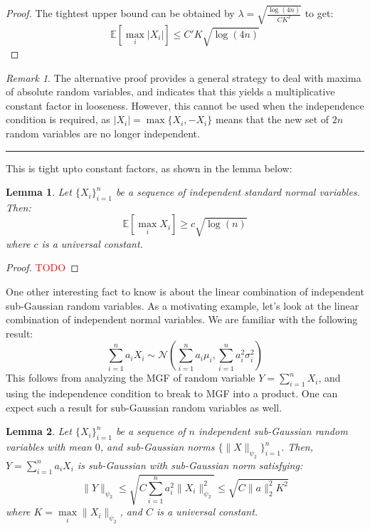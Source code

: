 \documentclass{article}
\newtheorem{lemma}{Lemma}[subsection]
\theoremstyle{remark}
\newtheorem*{remark}{Remark}
\newcommand{\comprule}{\textcolor[RGB]{220,220,220}{\rule{\linewidth}{0.2pt}}}
\newcommand{\Exp}{\mathbb{E}}
\newcommand{\calN}{\mathcal{N}}
\newcommand{\TODO}{\textcolor{red}{TODO}}
\begin{document}
\begin{proof}
The tightest upper bound can be obtained by \(\lambda = \sqrt{\frac{\log(4n)}{CK^{2}}}\) to get:
\begin{equation*}
\Exp\left[\max_{i} |X_{i}|\right] \leq C'K\sqrt{\log(4n)}
\end{equation*}
\end{proof}

\begin{remark}
The alternative proof provides a general strategy to deal with maxima of absolute random variables, and indicates that this yields a multiplicative constant factor in looseness. However, this cannot be used when the independence condition is required, as \(|X_{i}| = \max\{X_{i}, -X_{i}\}\) means that the new set of \(2n\) random variables are no longer independent.
\end{remark}

\comprule

This is tight upto constant factors, as shown in the lemma below:
\begin{lemma}
Let \(\{X_{i}\}_{i=1}^{n}\) be a sequence of independent standard normal variables. Then:
\begin{equation*}
\Exp\left[\max_{i} X_{i}\right] \geq c\sqrt{\log(n)}
\end{equation*}
where \(c\) is a universal constant.
\end{lemma}

\begin{proof}
\TODO
\end{proof}

One other interesting fact to know is about the linear combination of independent sub-Gaussian random variables. As a motivating example, let's look at the linear combination of independent normal variables. We are familiar with the following result:
\begin{equation*}
\sum_{i=1}^{n} a_{i}X_{i} \sim \calN\left(\sum_{i=1}^{n} a_{i}\mu_{i}, \sum_{i=1}^{n} a_{i}^{2}\sigma_{i}^{2}\right)
\end{equation*}
This follows from analyzing the MGF of random variable \(Y = \sum\limits_{i=1}^{n} X_{i}\), and using the independence condition to break to MGF into a product. One can expect such a result for sub-Gaussian random variables as well.

\begin{lemma}
\label{lem:sum-sub-gauss}
Let \(\{X_{i}\}_{i=1}^{n}\) be a sequence of \(n\) independent sub-Gaussian random variables with mean \(0\), and sub-Gaussian norms \(\{\|X\|_{\psi_{2}}\}_{i=1}^{n}\). Then, \(Y = \sum\limits_{i=1}^{n} a_{i}X_{i}\) is sub-Gaussian with sub-Gaussian norm satisfying:
\begin{equation*}
\|Y\|_{\psi_{2}} \leq \sqrt{C\sum_{i=1}^{n}a_{i}^{2}\|X_{i}\|^{2}_{\psi_{2}}} \leq \sqrt{C\|a\|_{2}^{2}K^{2}}
\end{equation*}
where \(K = \max\limits_{i} \|X_{i}\|_{\psi_{2}}\), and \(C\) is a universal constant.
\end{lemma}
\end{document}
